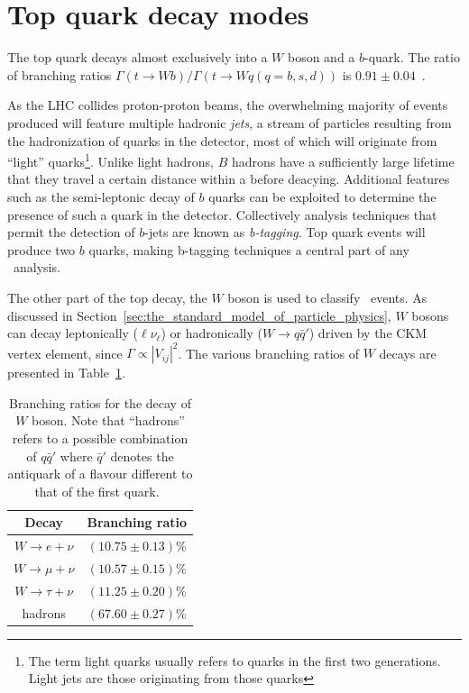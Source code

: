 \section{Top quark decay modes} \label{sec:top_quark_decay_modes}

The top quark decays almost exclusively into a $W$ boson and a $b$-quark. The ratio of branching ratios $\Gamma(t\rightarrow Wb)/\Gamma(t\rightarrow Wq(q=b,s,d))$ is $0.91\pm0.04$~\cite{Theory:PDGBooklet}.

As the LHC collides proton-proton beams, the overwhelming majority of events produced will feature multiple hadronic \textit{jets}, a stream of particles resulting from the hadronization of quarks in the detector, most of which will originate from ``light'' quarks\footnote{The term light quarks usually refers to quarks in the first two generations. Light jets are those originating from those quarks}. Unlike light hadrons, $B$ hadrons have a sufficiently large lifetime that they travel a certain distance within a before deacying. Additional features such as the semi-leptonic decay of $b$ quarks can be exploited to determine the presence of such a quark in the detector. Collectively analysis techniques that permit the detection of $b$-jets are known as \textit{b-tagging}. Top quark events will produce two $b$ quarks, making b-tagging techniques a central part of any \ttbar\ analysis.

The other part of the top decay, the $W$ boson is used to classify \ttbar\ events. As discussed in Section~\ref{sec:the_standard_model_of_particle_physics}, $W$ bosons can decay leptonically ($\ell\nu_{\ell}$) or hadronically ($W\rightarrow q\bar{q}'$) driven by the CKM vertex element, since $\Gamma\propto|V_{ij}|^2$. The various branching ratios of $W$ decays are presented in Table~\ref{tab:TopQuakWDecayBranchingRatios}.

\begin{table}
  \centering
  \begin{tabular}{|c|c|}
    \hline
    Decay                   & Branching ratio \\ \hline\hline
    $W\rightarrow e+\nu$    & $(10.75\pm0.13)\%$ \\
    $W\rightarrow \mu+\nu$  & $(10.57\pm0.15)\%$ \\
    $W\rightarrow \tau+\nu$ & $(11.25\pm0.20)\%$ \\
    hadrons                 & $(67.60\pm0.27)\%$ \\
    \hline
  \end{tabular}
  \caption{Branching ratios for the decay of $W$ boson. Note that ``hadrons'' refers to a possible combination of $q\bar{q}'$ where $\bar{q}'$ denotes the antiquark of a flavour different to that of the first quark.~\cite{Theory:PDGBooklet}}
  \label{tab:TopQuakWDecayBranchingRatios}
\end{table}

